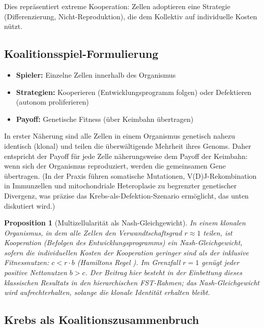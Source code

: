 \documentclass[12pt,a4paper]{article}
\newtheorem{proposition}{Proposition}
\theoremstyle{remark}
\begin{document}
Dies repr\"asentiert extreme Kooperation: Zellen adoptieren eine Strategie (Differenzierung, Nicht-Reproduktion), die dem Kollektiv auf individuelle Kosten n\"utzt.

\subsection{Koalitionsspiel-Formulierung}

\begin{itemize}
    \item \textbf{Spieler:} Einzelne Zellen innerhalb des Organismus
    \item \textbf{Strategien:} Kooperieren (Entwicklungsprogramm folgen) oder Defektieren (autonom proliferieren)
    \item \textbf{Payoff:} Genetische Fitness (\"uber Keimbahn \"ubertragen)
\end{itemize}

In erster N\"aherung sind alle Zellen in einem Organismus genetisch nahezu identisch (klonal) und teilen die \"uberw\"altigende Mehrheit ihres Genoms. Daher entspricht der Payoff f\"ur jede Zelle n\"aherungsweise dem Payoff der Keimbahn: wenn sich der Organismus reproduziert, werden die gemeinsamen Gene \"ubertragen. (In der Praxis f\"uhren somatische Mutationen, V(D)J-Rekombination in Immunzellen und mitochondriale Heteroplasie zu begrenzter genetischer Divergenz, was pr\"azise das Krebs-als-Defektion-Szenario erm\"oglicht, das unten diskutiert wird.)

\begin{proposition}[Multizellularit\"at als Nash-Gleichgewicht]
\label{prop:multicellularity}
In einem klonalen Organismus, in dem alle Zellen den Verwandtschaftsgrad $r \approx 1$ teilen, ist Kooperation (Befolgen des Entwicklungsprogramms) ein Nash-Gleichgewicht, sofern die individuellen Kosten der Kooperation geringer sind als der inklusive Fitnessnutzen: $c < r \cdot b$ (Hamiltons Regel \citep{Hamilton1964}). Im Grenzfall $r = 1$ gen\"ugt jeder positive Nettonutzen $b > c$. Der Beitrag hier besteht in der Einbettung dieses klassischen Resultats in den hierarchischen FST-Rahmen; das Nash-Gleichgewicht wird aufrechterhalten, solange die klonale Identit\"at erhalten bleibt.
\end{proposition}

\subsection{Krebs als Koalitionszusammenbruch}
\end{document}
